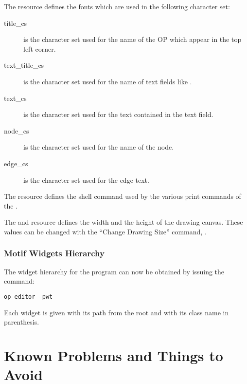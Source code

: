 The  resource defines the fonts which are used
in the following character set:

\begin{description}

\item[title\_cs] is the character set used for the name of the OP which
appear
in the top left corner.

\item[text\_title\_cs] is the character set used for the name of text
fields like .

\item[text\_cs] is the character set used for the text contained in the
text field.

\item[node\_cs] is the character set used for the name of the node.

\item[edge\_cs] is the character set used for the edge text.

\end{description}

The  resource defines the shell command used
by the various print commands of the \OPE{}.

The  and  resource
defines the width and the height of the drawing canvas. These values can
be changed with the ``Change Drawing Size'' command, .

\subsection{\OPE{} Motif Widgets Hierarchy}


The widget hierarchy for the \OPE{} program can now be obtained by issuing
the command:

\begin{verbatim}
op-editor -pwt
\end{verbatim}

Each widget is given with its path from the root and with its class name in
parenthesis.

\chapter{Known Problems and Things to Avoid}

